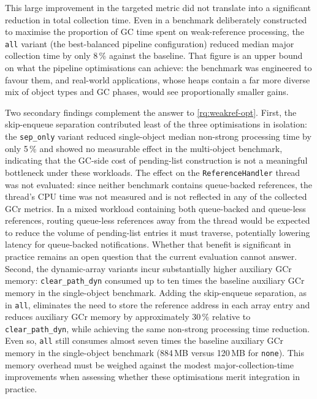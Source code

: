 This large improvement in the targeted metric did not translate into a significant reduction in total collection time. Even in a benchmark deliberately constructed to maximise the proportion of \ac{GC} time spent on weak-reference processing, the \texttt{all} variant (the best-balanced pipeline configuration) reduced median major collection time by only 8\,\% against the baseline. That figure is an upper bound on what the pipeline optimisations can achieve: the benchmark was engineered to favour them, and real-world applications, whose heaps contain a far more diverse mix of object types and \ac{GC} phases, would see proportionally smaller gains.

Two secondary findings complement the answer to \cref{rq:weakref-opt}. First, the skip-enqueue separation contributed least of the three optimisations in isolation: the \texttt{sep\_only} variant reduced single-object median non-strong processing time by only 5\,\% and showed no measurable effect in the multi-object benchmark, indicating that the GC-side cost of pending-list construction is not a meaningful bottleneck under these workloads. The effect on the \texttt{ReferenceHandler} thread was not evaluated: since neither benchmark contains queue-backed references, the thread's CPU time was not measured and is not reflected in any of the collected \ac{GCr} metrics. In a mixed workload containing both queue-backed and queue-less references, routing queue-less references away from the thread would be expected to reduce the volume of pending-list entries it must traverse, potentially lowering latency for queue-backed notifications. Whether that benefit is significant in practice remains an open question that the current evaluation cannot answer. Second, the dynamic-array variants incur substantially higher auxiliary \ac{GCr} memory: \texttt{clear\_path\_dyn} consumed up to ten times the baseline auxiliary \ac{GCr} memory in the single-object benchmark. Adding the skip-enqueue separation, as in \texttt{all}, eliminates the need to store the reference address in each array entry and reduces auxiliary \ac{GCr} memory by approximately 30\,\% relative to \texttt{clear\_path\_dyn}, while achieving the same non-strong processing time reduction. Even so, \texttt{all} still consumes almost seven times the baseline auxiliary \ac{GCr} memory in the single-object benchmark (884\,MB versus 120\,MB for \texttt{none}). This memory overhead must be weighed against the modest major-collection-time improvements when assessing whether these optimisations merit integration in practice.

